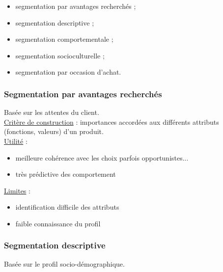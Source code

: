		\begin{itemize}
			\item segmentation par avantages recherchés ;
			\item segmentation descriptive ;
			\item segmentation comportementale ;
			\item segmentation socioculturelle ;
			\item segmentation par occasion d'achat.
		\end{itemize}
			
			\subsubsection{Segmentation par avantages recherchés}				
			Basée sur les attentes du client. \\
				
			\underline{Critère de construction} : importances accordées	aux différents attributs (fonctions, valeurs) d'un produit. \\
				
			\underline{Utilité} : 
			\begin{itemize}
				\item meilleure cohérence avec les choix parfois opportunistes...
				\item très prédictive des comportement
			\end{itemize}
			\n
			\underline{Limites} : 
			\begin{itemize}
				\item identification difficile des attributs
				\item faible connaissance du profil
			\end{itemize}			
				
				
				
				
			\subsubsection{Segmentation descriptive}
				
			Basée sur le profil socio-démographique. \\				
				
